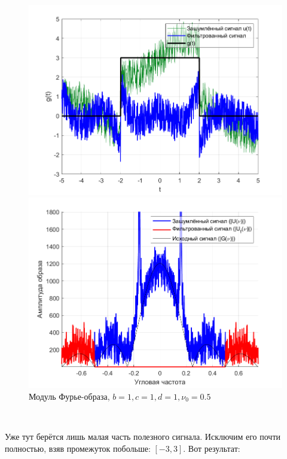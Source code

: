 \documentclass[a4paper]{article}
\begin{document}
\begin{figure}[H]
    \begin{minipage}{0.5\textwidth}
        \centering
        \includegraphics[width=\textwidth]{part3/1_1_1.png}
        \caption{$b = 1, c = 1, d = 1, \nu_0 = 0.5$}
    \end{minipage}    
    \begin{minipage}{0.5\textwidth}
        \centering
        \includegraphics[width=\textwidth]{part3/1_1_1_Fourier.png}
        \caption{Модуль Фурье-образа, $b = 1, c = 1, d = 1, \nu_0 = 0.5$}
    \end{minipage}
\end{figure}\

Уже тут берётся лишь малая часть полезного сигнала. Исключим его почти полностью, взяв промежуток побольше: $[-3, 3]$. Вот результат:
\end{document}

